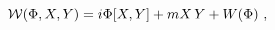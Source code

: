 \begin{equation}
  \label{eq:supot}
  {\cal W}(\Phi, X, Y)= i\Phi [X, Y] + m X\,Y + W(\Phi)\ ,
\end{equation}


